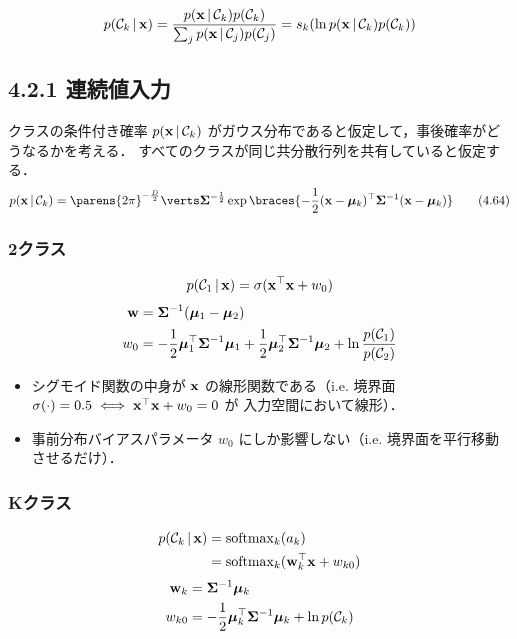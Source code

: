 \begin{equation}
  p({\mathcal{C}}_k \,|\, {\mathbf{x}}) = \frac{p({\mathbf{x}}\,|\,{\mathcal{C}}_{k})p({\mathcal{C}}_{k})}{\sum_j p({\mathbf{x}}\,|\,{\mathcal{C}}_{j})p({\mathcal{C}}_{j})} = s_k(\ln p({\mathbf{x}}\,|\,{\mathcal{C}}_{k})p({\mathcal{C}}_{k}))
\end{equation}


\subsection*{4.2.1 連続値入力}

クラスの条件付き確率 $p({\mathbf{x}} \,|\, {\mathcal{C}}_k)$ がガウス分布であると仮定して，事後確率がどうなるかを考える．
すべてのクラスが同じ共分散行列を共有していると仮定する．
\[
p(\vx \given \cC_k) = \parens{2\pi}^{-\frac{D}{2}} \abs{\mSigma}^{-\frac{1}{2}} \exp \braces{-\frac{1}{2} (\vx - \vmu_k)^\top \mSigma^{-1} (\vx - \vmu_k) } \tag{4.64}
\]

\subsubsection*{2クラス}

\begin{equation}
  p({\mathcal{C}}_1 \,|\, {\mathbf{x}}) = \sigma({\mathbf{x}}^\top {\mathbf{x}} + w_0)
\end{equation}
\begin{align}
  {\mathbf{w}} & = \boldsymbol{\Sigma}^{-1} (\boldsymbol{\mu}_1 - \boldsymbol{\mu}_2) \\
  w_0 & = -\frac{1}{2} \boldsymbol{\mu}_1^\top \boldsymbol{\Sigma}^{-1} \boldsymbol{\mu}_1 + \frac{1}{2} \boldsymbol{\mu}_2^\top \boldsymbol{\Sigma}^{-1} \boldsymbol{\mu}_2 + \ln \frac{p({\mathcal{C}}_1)}{p({\mathcal{C}}_2)}
\end{align}

\begin{itemize}
  \item シグモイド関数の中身が ${\mathbf{x}}$ の線形関数である（i.e. 境界面 $\sigma(\cdot) = 0.5 \iff {\mathbf{x}}^\top {\mathbf{x}} + w_0 = 0$ が 入力空間において線形）．
  \item 事前分布バイアスパラメータ $w_0$ にしか影響しない（i.e. 境界面を平行移動させるだけ）．
\end{itemize}

\subsubsection*{Kクラス}

\begin{align}
  p({\mathcal{C}}_k \,|\, {\mathbf{x}}) & = \mathrm{softmax}_k(a_k) \notag \\
  & =  \mathrm{softmax}_k( {\mathbf{w}}_k^\top {\mathbf{x}} + w_{k0} )
\end{align}
\begin{align}
  {\mathbf{w}}_k & = \boldsymbol{\Sigma}^{-1} \boldsymbol{\mu}_k \\
  w_{k0} & = -\frac{1}{2} \boldsymbol{\mu}_k^\top \boldsymbol{\Sigma}^{-1} \boldsymbol{\mu}_k + \ln p({\mathcal{C}}_k)
\end{align}

